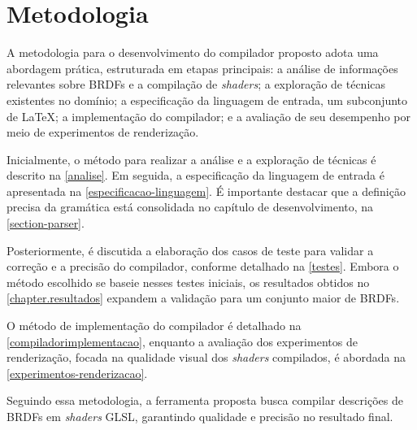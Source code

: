 \chapter{Metodologia} \label{metodologia}

A metodologia para o desenvolvimento do compilador proposto adota uma abordagem prática, estruturada em etapas principais: a análise de informações relevantes sobre BRDFs e a compilação de \textit{shaders}; a exploração de técnicas existentes no domínio; a especificação da linguagem de entrada, um subconjunto de \LaTeX{}; a implementação do compilador; e a avaliação de seu desempenho por meio de experimentos de renderização.

Inicialmente, o método para realizar a análise e a exploração de técnicas é descrito na \autoref{analise}. Em seguida, a especificação da linguagem de entrada é apresentada na \autoref{especificacao-linguagem}. É importante destacar que a definição precisa da gramática está consolidada no capítulo de desenvolvimento, na \autoref{section-parser}.

Posteriormente, é discutida a elaboração dos casos de teste para validar a correção e a precisão do compilador, conforme detalhado na \autoref{testes}. Embora o método escolhido se baseie nesses testes iniciais, os resultados obtidos no \autoref{chapter.resultados} expandem a validação para um conjunto maior de BRDFs.

O método de implementação do compilador é detalhado na \autoref{compiladorimplementacao}, enquanto a avaliação dos experimentos de renderização, focada na qualidade visual dos \textit{shaders} compilados, é abordada na \autoref{experimentos-renderizacao}.


Seguindo essa metodologia, a ferramenta proposta busca compilar descrições de BRDFs em \textit{shaders} GLSL, garantindo qualidade e precisão no resultado final.




